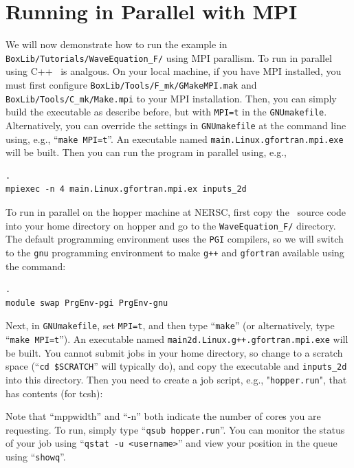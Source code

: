 \section{Running in Parallel with MPI}
We will now demonstrate how to run the example in {\tt BoxLib/Tutorials/WaveEquation\_F/}
using MPI parallism.  To run in parallel using C++ \BoxLib\ is analgous.
On your local machine, if you have MPI installed, you must first configure
{\tt BoxLib/Tools/F\_mk/GMakeMPI.mak} and {\tt BoxLib/Tools/C\_mk/Make.mpi}
to your MPI installation.  Then, you 
can simply build the executable as describe before, but with {\tt MPI=t} 
in the {\tt GNUmakefile}.  Alternatively, you can override the settings in 
{\tt GNUmakefile} at the command line using, e.g., ``{\tt make MPI=t}''.  
An executable named {\tt main.Linux.gfortran.mpi.exe} will be built.
Then you can run the program in parallel using, e.g.,
\begin{lstlisting}[backgroundcolor=\color{light-red}].
mpiexec -n 4 main.Linux.gfortran.mpi.ex inputs_2d
\end{lstlisting}

To run in parallel on the hopper machine at NERSC, first copy the \BoxLib\ source code
into your home directory on hopper and go to the {\tt WaveEquation\_F/} directory.
The default programming environment uses the {\tt PGI} compilers, so we will switch to the
{\tt gnu} programming environment to make {\tt g++} and {\tt gfortran} available
using the command:
\begin{lstlisting}[backgroundcolor=\color{light-red}].
module swap PrgEnv-pgi PrgEnv-gnu
\end{lstlisting}
Next, in {\tt GNUmakefile}, set {\tt MPI=t}, and then type ``{\tt make}''
(or alternatively, type ``{\tt make MPI=t}'').
An executable named {\tt main2d.Linux.g++.gfortran.mpi.exe} will be built.
You cannot submit jobs in your home directory, so change to a scratch space
(``{\tt cd \$SCRATCH}'' will typically do), and copy the executable and
{\tt inputs\_2d} into this directory.  Then you need to create a job script,
e.g., "{\tt hopper.run}", that has contents (for tcsh):

Note that ``mppwidth'' and ``-n'' both indicate the number of cores you are requesting.
To run, simply type ``{\tt qsub hopper.run}''.  You can monitor the status of your job
using ``{\tt qstat -u <username>}'' and view your position in the queue 
using ``{\tt showq}''.

